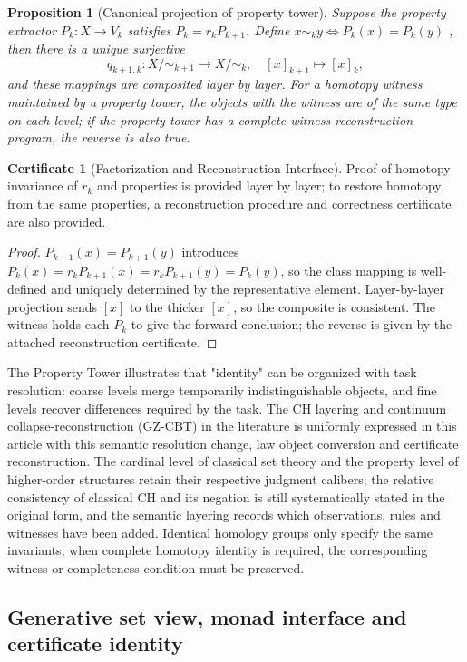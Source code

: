 \documentclass[11pt,a4paper]{article}
\theoremstyle{plain}
\newtheorem{proposition}[theorem]{Proposition}
\theoremstyle{definition}
\newtheorem*{certificate}{Certificate}
\theoremstyle{remark}
\begin{document}
\begin{CJK*}
\begin{proposition}
[Canonical projection of property tower]\label{fa:prop-propertytower}
Suppose the property extractor $P_k:X\to V_k$ satisfies $P_k=r_kP_{k+1}$. Define $x\sim_k y\iff P_k(x)=P_k(y)$ , then there is a unique surjective \[
 q_{k+1,k}:X/{\sim_{k+1}}\longrightarrow X/{\sim_k},\quad
 [x]_{k+1}\longmapsto[x]_k,
\] and these mappings are composited layer by layer. For a homotopy witness maintained by a property tower, the objects with the witness are of the same type on each level; if the property tower has a complete witness reconstruction program, the reverse is also true.\end{proposition}
\begin{certificate}
[Factorization and Reconstruction Interface]Proof of homotopy invariance of $r_k$ and properties is provided layer by layer; to restore homotopy from the same properties, a reconstruction procedure and correctness certificate are also provided.\end{certificate}
\begin{proof}
$P_{k+1}(x)=P_{k+1}(y)$ introduces $P_k(x)=r_kP_{k+1}(x)=r_kP_{k+1}(y)=P_k(y)$, so the class mapping is well-defined and uniquely determined by the representative element. Layer-by-layer projection sends $[x]$ to the thicker $[x]$, so the composite is consistent. The witness holds each $P_k$ to give the forward conclusion; the reverse is given by the attached reconstruction certificate.\end{proof}


The Property Tower illustrates that "identity" can be organized with task resolution: coarse levels merge temporarily indistinguishable objects, and fine levels recover differences required by the task. The CH layering and continuum collapse-reconstruction (GZ-CBT) in the literature is uniformly expressed in this article with this semantic resolution change, law object conversion and certificate reconstruction. The cardinal level of classical set theory and the property level of higher-order structures retain their respective judgment calibers; the relative consistency of classical CH and its negation is still systematically stated in the original form, and the semantic layering records which observations, rules and witnesses have been added. Identical homology groups only specify the same invariants; when complete homotopy identity is required, the corresponding witness or completeness condition must be preserved. \cite{S01,S06,S10}

\subsection { Generative set view, monad interface and certificate identity }


\end{CJK*}
\end{document}

